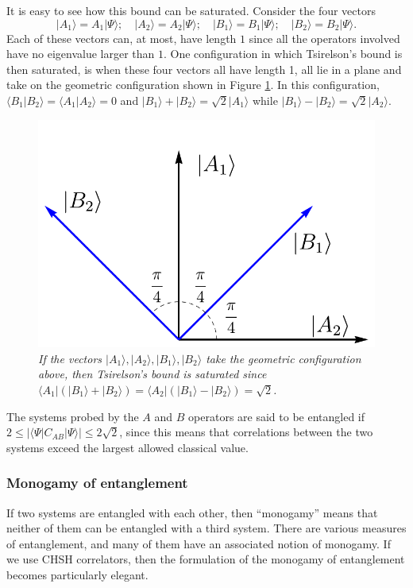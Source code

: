 \documentclass[12pt]{article}
\newcommand{\be}{\begin{equation}}
\newcommand{\ee}{\end{equation}}
\begin{document}
It is easy to see how this bound can be saturated. Consider the four vectors
\be
|A_1 \rangle = A_1 | \Psi \rangle; \quad  |A_2 \rangle = A_2 | \Psi \rangle; \quad  |B_1 \rangle = B_1 | \Psi \rangle; \quad  |B_2 \rangle = B_2 | \Psi \rangle.
\ee
Each of these vectors can, at most, have length $1$ since all the operators involved have no eigenvalue larger than $1$.   One configuration in which Tsirelson's bound is then saturated, is  when these four vectors all have length 1, all lie in a plane and take on the geometric configuration shown in Figure \ref{figcirelson}. In this configuration, $\langle B_1 | B_2 \rangle = \langle A_1 | A_2 \rangle = 0$ and  $|B_1 \rangle + |B_2 \rangle = \sqrt{2} |A_1 \rangle$ while $|B_1 \rangle - |B_2 \rangle = \sqrt{2} |A_2 \rangle$.
\begin{figure}[!ht]
\begin{center}
\includegraphics[height=0.3\textheight]{cirelsonplot.pdf}
\caption{\em If the vectors $|A_1 \rangle, |A_2 \rangle, |B_1 \rangle, |B_2 \rangle$ take the geometric configuration above, then Tsirelson's bound is saturated since $\langle A_1 | (|B_1 \rangle + |B_2 \rangle)  = \langle A_2| (|B_1 \rangle - |B_2 \rangle ) = \sqrt{2}$. \label{figcirelson}}
\end{center}
\end{figure}

The systems probed by the $A$ and $B$ operators are said to be entangled if $2 \leq |\langle \Psi | C_{AB} |\Psi  \rangle| \leq 2 \sqrt{2}$, since this means that correlations between the two systems exceed the largest allowed classical value.



\subsubsection*{Monogamy of entanglement }
If  two systems are entangled with each other, then ``monogamy'' means that neither of them can be entangled with a third system. There are various measures of entanglement, and many of them have an associated notion of monogamy. If we use CHSH
correlators, then the formulation of the monogamy of entanglement becomes particularly elegant.
\end{document}
